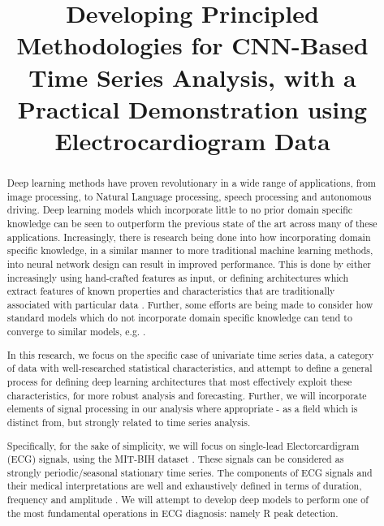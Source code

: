 \documentclass[9pt,conference]{IEEEtran}
\begin{document}
\title{Developing Principled Methodologies for CNN-Based Time Series Analysis, with a Practical Demonstration using Electrocardiogram Data}
\author{
}
\maketitle
\begin{abstract}

Deep learning methods have proven revolutionary in a wide range of applications, from image processing, to Natural Language processing, speech processing and autonomous driving. Deep learning models which incorporate little to no prior domain specific knowledge can be seen to outperform the previous state of the art across many of these applications. Increasingly, there is research being done into how incorporating domain specific knowledge, in a similar manner to more traditional machine learning methods, into neural network design can result in improved performance. This is done by either increasingly using hand-crafted features as input, or defining architectures which extract features of known properties and characteristics that are traditionally associated with particular data \cite{medFeatureDNNReview} \cite{preprocessedSpeech}. Further, some efforts are being made to consider how standard models which do not incorporate domain specific knowledge can tend to converge to similar models, e.g. \cite{speechCNNTendstoBP}.

In this research, we focus on the specific case of univariate time series data, a category of data with well-researched statistical characteristics, and attempt to define a general process for defining deep learning architectures that most effectively exploit these characteristics, for more robust analysis and forecasting. Further, we will incorporate elements of signal processing in our analysis where appropriate - as a field which is distinct from, but strongly related to time series analysis. 

Specifically, for the sake of simplicity, we will focus on single-lead Electorcardigram (ECG) signals, using the MIT-BIH dataset \cite{dataset}. These signals can be considered as strongly periodic/seasonal stationary time series. The components of ECG signals and their medical interpretations are well and exhaustively defined in terms of duration, frequency and amplitude \cite{cardioBook}. We will attempt to develop deep models to perform one of the most fundamental operations in ECG diagnosis: namely R peak detection.


\end{abstract}
\end{document}
